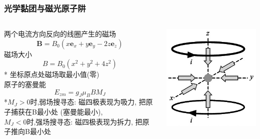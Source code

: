 \begin{frame} 
\frametitle{光学黏团与磁光原子阱}
\begin{columns}
    \begin{column}[t]{0.76\linewidth}
        两个电流方向反向的线圈产生的磁场
        \[  \mathbf{B} = B_0 (x \mathbf{e}_x + y \mathbf{e}_y -2z \mathbf{e}_z)\]
        磁场大小
        \[ B= B_0  (x^2 + y^2 + 4z^2)\]
        * 坐标原点处磁场取最小值(零) \\ 
        原子的塞曼能 
        \[ E_{zm} = g_J \mu_B B M_J \]
        *$M_J > 0 $时,弱场搜寻态: 磁四极表现为吸力, 把原子捕获在B最小处 (塞曼能最小), \\  
        $M_J < 0 $时,强场搜寻态: 磁四极表现为拆力, 把原子推向B最小处 \\ 
    \end{column}
    \begin{column}[t]{0.230\linewidth} 
       \begin{center}
            \includegraphics[width=1.0\textwidth]{figs/2022-05-30-12-43-21.png}

\end{center}
\end{column}
\end{columns}
\end{frame}
